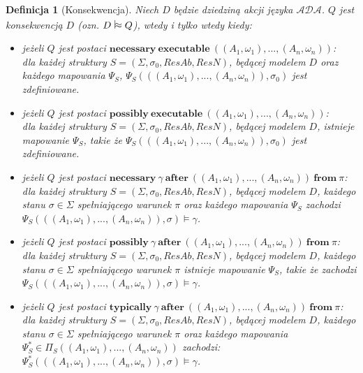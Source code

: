 \documentclass[11pt,a4paper]{article}
\newtheorem{definition}{Definicja}[section]
\newcommand{\vapprox}{\mathrel{\scalebox{1}[2]{$\shortmid$}\mkern-3.1mu\raisebox{0.1ex}{$\approx$}}}
\begin{document}
    \begin{definition}[Konsekwencja]
    	Niech $D$ będzie dziedziną akcji języka $\mathcal{ADA}$. $Q$ jest konsekwencją $D$ (ozn. $D \vapprox Q$), wtedy i tylko wtedy kiedy:
    
    \begin{itemize}
    	\item jeżeli $Q$ jest postaci $\mathbf{necessary}~\mathbf{executable}~((A_1, \omega_1),...,(A_n,\omega_n))$: \\ dla każdej struktury $S=(\Sigma, \sigma_0, ResAb, ResN)$, będącej modelem $D$ oraz każdego mapowania $\Psi_S$, $\Psi_S(((A_1, \omega_1), ..., (A_n, \omega_n)), \sigma_0)$ jest zdefiniowane.
    	
    	\item jeżeli $Q$ jest postaci $\mathbf{possibly}~\mathbf{executable}~((A_1, \omega_1),...,(A_n,\omega_n))$: \\ dla każdej struktury $S=(\Sigma, \sigma_0, ResAb, ResN)$, będącej modelem $D$, istnieje mapowanie $\Psi_S$, takie że $\Psi_S(((A_1, \omega_1), ..., (A_n, \omega_n)), \sigma_0)$ jest zdefiniowane.
    	
    	\item jeżeli $Q$ jest postaci $\mathbf{necessary}~\gamma~\mathbf{after}~((A_1, \omega_1),...,(A_n,\omega_n))~\mathbf{from}~\pi$: \\
    	dla każdej struktury $S=(\Sigma, \sigma_0, ResAb, ResN)$, będącej modelem $D$, każdego stanu $\sigma \in \Sigma$ spełniającego warunek $\pi$ oraz każdego mapowania $\Psi_S$ zachodzi $\Psi_S(((A_1, \omega_1), ..., (A_n, \omega_n)), \sigma) \models \gamma$.
    	
    	\item jeżeli $Q$ jest postaci $\mathbf{possibly}~\gamma~\mathbf{after}~((A_1, \omega_1),...,(A_n,\omega_n))~\mathbf{from}~\pi$: \\
    	dla każdej struktury $S=(\Sigma, \sigma_0, ResAb, ResN)$, będącej modelem $D$, każdego stanu $\sigma \in \Sigma$ spełniającego warunek $\pi$ istnieje mapowanie $\Psi_S$, takie że zachodzi $\Psi_S(((A_1, \omega_1), ..., (A_n, \omega_n)), \sigma) \models \gamma$.
    	
    	\item jeżeli $Q$ jest postaci $\mathbf{typically}~\gamma~\mathbf{after}~((A_1, \omega_1),...,(A_n,\omega_n))~\mathbf{from}~\pi$: \\
    	dla każdej struktury $S=(\Sigma, \sigma_0, ResAb, ResN)$, będącej modelem $D$, każdego stanu $\sigma \in \Sigma$ spełniającego warunek $\pi$ oraz każdego mapowania $\Psi_S^{*} \in \Pi_S((A_1, \omega_1),...,(A_n,\omega_n))$ zachodzi: \\ $\Psi_S^{*}(((A_1, \omega_1), ..., (A_n, \omega_n)), \sigma) \models \gamma$.
    	

\end{itemize}
\end{definition}
\end{document}
